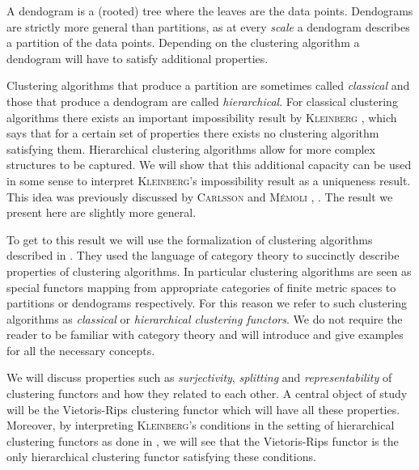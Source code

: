 A dendogram is a (rooted) tree where the leaves are the data points. Dendograms are strictly more general than partitions, as at every \emph{scale} a dendogram describes a partition of the data points.
Depending on the clustering algorithm a dendogram will have to satisfy additional properties.

Clustering algorithms that produce a partition are sometimes called \emph{classical} and those that produce a dendogram are called \emph{hierarchical}.
For classical clustering algorithms there exists an important impossibility result by \textsc{Kleinberg} \cite{Kleinberg2002}, which says that for a certain set of properties there exists no clustering algorithm satisfying them.
Hierarchical clustering algorithms allow for more complex structures to be captured. We will show that this additional capacity can be used in some sense to interpret \textsc{Kleinberg}'s impossibility result as a uniqueness result. This idea was previously discussed by \textsc{Carlsson} and \textsc{M\'emoli} \cite{JMLR:v11:carlsson10a}, \cite{Carlsson2010}. The result we present here are slightly more general.

To get to this result we will use the formalization of clustering algorithms described in \cite{Carlsson2010}. They used the language of category theory to succinctly describe properties of clustering algorithms. In particular clustering algorithms are seen as special functors mapping from appropriate categories of finite metric spaces to partitions or dendograms respectively. For this reason we refer to such clustering algorithms as \emph{classical} or \emph{hierarchical clustering functors}. We do not require the reader to be familiar with category theory and will introduce and give examples for all the necessary concepts.

We will discuss properties such as \emph{surjectivity}, \emph{splitting} and \emph{representability} of clustering functors and how they related to each other. A central object of study will be the Vietoris-Rips clustering functor which will have all these properties. Moreover, by interpreting \textsc{Kleinberg}'s conditions in the setting of hierarchical clustering functors as done in \cite[Sec.~7.3.1]{Carlsson2010}, we will see that the Vietoris-Rips functor is the only hierarchical clustering functor satisfying these conditions.

